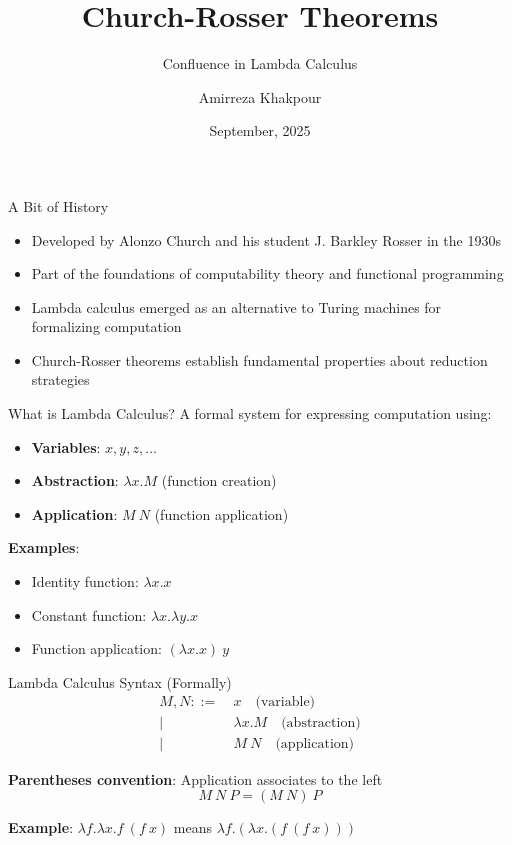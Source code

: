 \documentclass[10pt]{beamer}
\title{Church-Rosser Theorems}
\subtitle{Confluence in Lambda Calculus}
\author{Amirreza Khakpour}
\date{September, 2025}
\begin{document}
\begin{frame}
\titlepage
\end{frame}

\begin{frame}{A Bit of History}
\begin{itemize}
\item Developed by Alonzo Church and his student J. Barkley Rosser in the 1930s
\item Part of the foundations of computability theory and functional programming
\item Lambda calculus emerged as an alternative to Turing machines for formalizing computation
\item Church-Rosser theorems establish fundamental properties about reduction strategies
\end{itemize}
\end{frame}

\begin{frame}{What is Lambda Calculus?}
A formal system for expressing computation using:
\begin{itemize}
\item \textbf{Variables}: \(x, y, z, \ldots\)
\item \textbf{Abstraction}: \(\lambda x.M\) (function creation)
\item \textbf{Application}: \(M\ N\) (function application)
\end{itemize}

\vspace{0.3cm}
\textbf{Examples}:
\begin{itemize}
\item Identity function: \(\lambda x.x\)
\item Constant function: \(\lambda x.\lambda y.x\)
\item Function application: \((\lambda x.x)\ y\)
\end{itemize}
\end{frame}

\begin{frame}{Lambda Calculus Syntax (Formally)}
\begin{align*}
M, N ::= &\ x \quad \text{(variable)} \\
\mid &\ \lambda x.M \quad \text{(abstraction)} \\
\mid &\ M\ N \quad \text{(application)}
\end{align*}

\textbf{Parentheses convention}: Application associates to the left
\[
M\ N\ P = (M\ N)\ P
\]

\textbf{Example}: \(\lambda f.\lambda x.f\ (f\ x)\) means \(\lambda f.(\lambda x.(f\ (f\ x)))\)
\end{frame}
\end{document}
